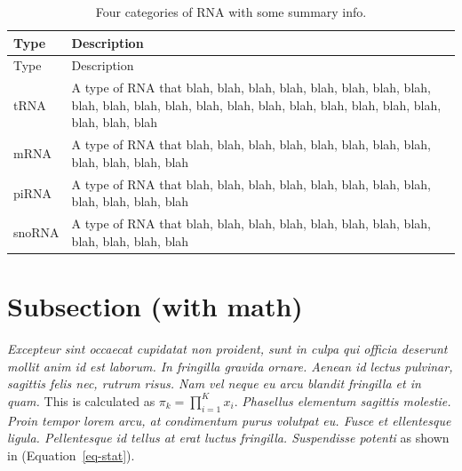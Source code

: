 \documentclass[
  10pt,
  a4paper,
]{scrbook}
\let\oldemph\emph
\renewcommand\emph[1]{\oldemph{\color{gray}#1}} %
\begin{document}
\begin{longtable}[]{@{}
  >{\raggedright\arraybackslash}p{}
  >{\raggedright\arraybackslash}p{}@{}}
\caption{Four categories of RNA with some summary
info.}\label{tbl-inline}\tabularnewline
\toprule\noalign{}
\begin{minipage}[b]{\linewidth}\raggedright
Type
\end{minipage} & \begin{minipage}[b]{\linewidth}\raggedright
Description
\end{minipage} \\
\midrule\noalign{}
\endfirsthead
\toprule\noalign{}
\begin{minipage}[b]{\linewidth}\raggedright
Type
\end{minipage} & \begin{minipage}[b]{\linewidth}\raggedright
Description
\end{minipage} \\
\midrule\noalign{}
\endhead
\bottomrule\noalign{}
\endlastfoot
tRNA & A type of RNA that blah, blah, blah, blah, blah, blah, blah,
blah, blah, blah, blah, blah, blah, blah, blah, blah, blah, blah, blah,
blah, blah, blah, blah \\
mRNA & A type of RNA that blah, blah, blah, blah, blah, blah, blah,
blah, blah, blah, blah, blah \\
piRNA & A type of RNA that blah, blah, blah, blah, blah, blah, blah,
blah, blah, blah, blah, blah \\
snoRNA & A type of RNA that blah, blah, blah, blah, blah, blah, blah,
blah, blah, blah, blah, blah \\
\end{longtable}

\section{Subsection (with math)}\label{subsection-with-math}

\emph{Excepteur sint occaecat cupidatat non proident, sunt in culpa qui
officia deserunt mollit anim id est laborum. In fringilla gravida
ornare. Aenean id lectus pulvinar, sagittis felis nec, rutrum risus. Nam
vel neque eu arcu blandit fringilla et in quam.} This is calculated as
\(\pi_k = \prod_{i=1}^K x_i\). \emph{Phasellus elementum sagittis
molestie. Proin tempor lorem arcu, at condimentum purus volutpat eu.
Fusce et ellentesque ligula. Pellentesque id tellus at erat luctus
fringilla. Suspendisse potenti} as shown in (Equation~\ref{eq-stat}).
\end{document}
